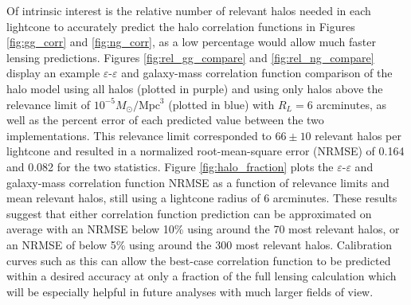 \documentclass[%
 reprint,
 amsmath,amssymb,
 aps,nofootinbib
]{revtex4-1}
\begin{document}
Of intrinsic interest is the relative number of relevant halos needed in each lightcone to accurately predict the halo correlation functions in Figures \ref{fig:gg_corr} and \ref{fig:ng_corr}, as a low percentage would allow much faster lensing predictions. Figures \ref{fig:rel_gg_compare} and \ref{fig:rel_ng_compare} display an example $\varepsilon$-$\varepsilon$ and galaxy-mass correlation function comparison of the halo model using all halos (plotted in purple) and using only halos above the relevance limit of ${10^{-5} M_{\odot}/\text{Mpc}^3}$ (plotted in blue) with $R_L=6$ arcminutes, as well as the percent error of each predicted value between the two implementations. This relevance limit corresponded to $66\pm10$ relevant halos per lightcone and resulted in a normalized root-mean-square error (NRMSE) of 0.164 and 0.082 for the two statistics. Figure \ref{fig:halo_fraction} plots the $\varepsilon$-$\varepsilon$ and galaxy-mass correlation function NRMSE as a function of relevance limits and mean relevant halos, still using a lightcone radius of 6 arcminutes. These results suggest that either correlation function prediction can be approximated on average with an NRMSE below 10\% using around the 70 most relevant halos, or an NRMSE of below 5\% using around the 300 most relevant halos. Calibration curves such as this can allow the best-case correlation function to be predicted within a desired accuracy at only a fraction of the full lensing calculation which will be especially helpful in future analyses with much larger fields of view.
\end{document}
